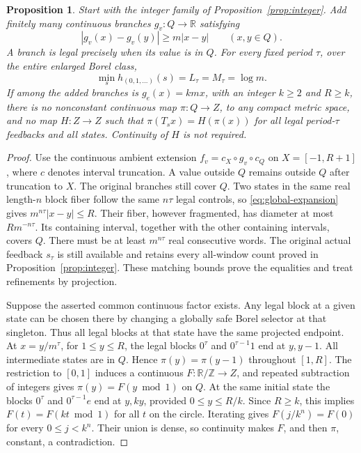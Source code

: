 \documentclass[11pt,reqno]{amsart}
\numberwithin{equation}{section}
\newtheorem{proposition}[theorem]{Proposition}
\theoremstyle{definition}
\begin{document}
\begin{proposition}\label{prop:extension}
Start with the integer family of Proposition~\ref{prop:integer}. Add
finitely many continuous branches $g_v:Q\to\mathbb R$ satisfying
\begin{equation}\label{eq:global-expansion}
 |g_v(x)-g_v(y)|\ge m|x-y|\qquad(x,y\in Q).
\end{equation}
A branch is legal precisely when its value is in $Q$.
For every fixed period $\tau$, over the entire enlarged Borel class,
\[
 \min_s h_{(0,1,\ldots)}(s)=L_\tau=M_\tau=\log m.
\]
If among the added branches is $g_e(x)=kmx$, with an integer
$k\ge2$ and $R\ge k$, there is no nonconstant continuous map
$\pi:Q\to Z$, to any compact metric space, and no map $H:Z\to Z$
such that $\pi(T_sx)=H(\pi(x))$ for all legal period-$\tau$
feedbacks and all states. Continuity of $H$ is not required.
\end{proposition}
\begin{proof}
Use the continuous ambient extension
$f_v=c_X\circ g_v\circ c_Q$ on $X=[-1,R+1]$, where $c$ denotes
interval truncation. A value outside $Q$ remains outside $Q$ after
truncation to $X$. The original branches still cover $Q$.
Two states in the same real length-$n$ block fiber follow the same
$n\tau$ legal controls, so \eqref{eq:global-expansion} gives
$m^{n\tau}|x-y|\le R$. Their fiber, however fragmented, has
diameter at most $Rm^{-n\tau}$. Its containing interval, together
with the other containing intervals, covers $Q$. There must be at
least $m^{n\tau}$ real consecutive words. The original actual
feedback $s_\tau$ is still available and retains every all-window
count proved in Proposition~\ref{prop:integer}. These matching
bounds prove the equalities and treat refinements by projection.

Suppose the asserted common continuous factor exists. Any legal block
at a given state can be chosen there by changing a globally safe
Borel selector at that singleton. Thus all legal blocks at that
state have the same projected endpoint. At $x=y/m^\tau$, for
$1\le y\le R$, the legal blocks $0^\tau$ and $0^{\tau-1}1$
end at $y,y-1$. All intermediate states are in $Q$. Hence
$\pi(y)=\pi(y-1)$ throughout $[1,R]$. The restriction to $[0,1]$
induces a continuous $F:\mathbb R/\mathbb Z\to Z$, and repeated
subtraction of integers gives $\pi(y)=F(y\bmod1)$ on $Q$.
At the same initial state the blocks $0^\tau$ and $0^{\tau-1}e$
end at $y,ky$, provided $0\le y\le R/k$. Since $R\ge k$,
this implies $F(t)=F(kt\bmod1)$ for all $t$ on the circle.
Iterating gives $F(j/k^n)=F(0)$ for every $0\le j<k^n$.
Their union is dense, so continuity makes $F$, and then $\pi$,
constant, a contradiction.
\end{proof}
\end{document}
